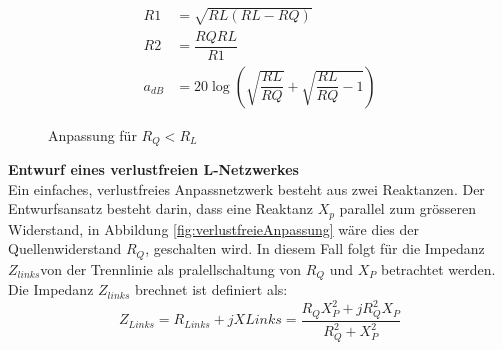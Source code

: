 \begin{align}
R1 &= \sqrt{RL(RL-RQ)} \label{eq:R1R2wennRLgrösserRQ_R1}\\
R2 &= \dfrac{RQ RL}{R1} \label{eq:R1R2wennRLgrösserRQ_R2}\\
a_{dB} &= 20\log \left( \sqrt{\dfrac{RL}{RQ}}+\sqrt{\dfrac{RL}{RQ}-1}\right)
\end{align}
\begin{figure}[h]
	\begin{center}
	\end{center}
\caption{Anpassung für $R_Q < R_L$}
\label{fig:LeistungsanpassungU0_RQkleiner_als_RL}
\end{figure}

\textbf{Entwurf eines verlustfreien L-Netzwerkes}\\
Ein einfaches, verlustfreies Anpassnetzwerk besteht aus zwei Reaktanzen. Der Entwurfsansatz besteht darin, dass eine Reaktanz $X_{p}$ parallel zum grösseren Widerstand, in Abbildung \ref{fig:verlustfreieAnpassung} wäre dies der Quellenwiderstand $R_{Q}$, geschalten wird. In diesem Fall folgt für die Impedanz $Z_{links} $von der Trennlinie als pralellschaltung von $R_Q$ und $X_P$ betrachtet werden. \\
Die Impedanz $Z_{links}$ brechnet ist definiert als:
\begin{equation}
Z_{Links}= R_{Links}+jX{Links}=\dfrac{R_QX_P^2+jR_Q^2X_P}{R_Q^2+X_P^2}
\end{equation}

